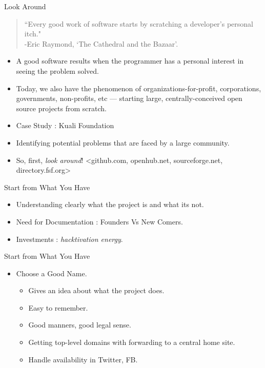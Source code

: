 \documentclass{beamer}
\begin{document}
\begin{frame}{Look Around}
\begin{quote}
\tiny{``Every good work of software starts by scratching a developer's personal itch."\\ -Eric Raymond, `The Cathedral and the Bazaar'.}
\end{quote}
\begin{itemize}
	\item A good software results when the programmer has a personal interest in seeing the problem solved. 
	\item Today, we also have the phenomenon of organizations-for-profit, corporations, governments, non-profits, etc — starting large, centrally-conceived open source projects from scratch. 
	\item Case Study : Kuali Foundation 
	\item Identifying potential problems that are faced by a large community. 
	\item So, first, \emph{look around}! <github.com, openhub.net, sourceforge.net, directory.fsf.org>
\end{itemize}
\end{frame}

\begin{frame}{Start from What You Have}
\begin{itemize}
	\item Understanding clearly what the project is and what its not.
	\item Need for Documentation : Founders Vs New Comers.
	\item Investments : \emph{hacktivation energy}.
\end{itemize}
\end{frame}

\begin{frame}{Start from What You Have}
\begin{itemize}
	\item Choose a Good Name. 
	\begin{itemize}
		\item Gives an idea about what the project does.
		\item Easy to remember. 
		\item Good manners, good legal sense. 
		\item Getting top-level domains with forwarding to a central home site. 
		\item Handle availability in Twitter, FB.	
	\end{itemize}
\end{itemize}
\end{frame}
\end{document}
